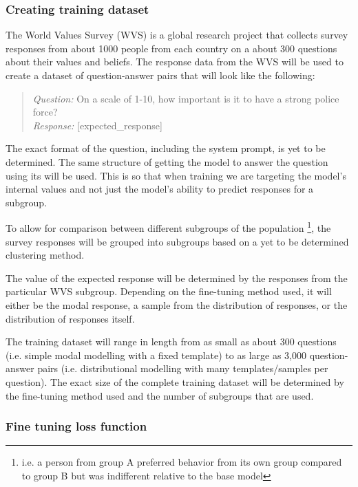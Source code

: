 \documentclass[11pt, a4paper]{article}
\begin{document}
\subsubsection{Creating training dataset}

The World Values Survey (WVS)\cite{WVS2020} is a global research project that collects survey responses from about 1000 people from each country on a about 300 questions about their values and beliefs. The response data from the WVS will be used to create a dataset of question-answer pairs that will look like the following:
\begin{quote}
\textit{Question:} On a scale of 1-10, how important is it to have a strong police force? \\
\textit{Response:} [expected\_response]
\end{quote}

The exact format of the question, including the system prompt, is yet to be determined. The same structure of getting the model to answer the question using its  will be used. This is so that when training we are targeting the model's internal values and not just the model's ability to predict responses for a subgroup.

To allow for comparison between different subgroups of the population \footnote{i.e. a person from group A preferred behavior from its own group compared to group B but was indifferent relative to the base model}, the survey responses will be grouped into subgroups based on a yet to be determined clustering method.

The value of the expected response will be determined by the responses from the particular WVS subgroup. Depending on the fine-tuning method used, it will either be the modal response, a sample from the distribution of responses, or the distribution of responses itself. 

The training dataset will range in length from as small as about 300 questions (i.e. simple modal modelling with a fixed template) to as large as 3,000 question-answer pairs (i.e. distributional modelling with many templates/samples per question). The exact size of the complete training dataset will be determined by the fine-tuning method used and the number of subgroups that are used.

\subsubsection{Fine tuning loss function}
\end{document}
